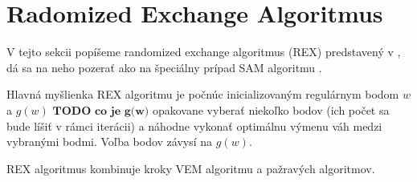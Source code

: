 \section {Radomized Exchange Algoritmus}

V tejto sekcii popíšeme randomized exchange algoritmus (REX) predstavený v \cite{rex_harman}, dá sa na neho pozerať ako na špeciálny prípad SAM algoritmu \cite{rex_harman}.

Hlavná myšlienka REX algoritmu je počnúc inicializovaným regulárnym bodom $w$ a $g(w)$ $\textbf{TODO co je g(w)}$ opakovane vyberať niekoľko bodov (ich počet sa bude líšiť v rámci iterácii) a náhodne vykonať optimálnu výmenu váh medzi vybranými bodmi. Voľba bodov závysí na $g(w)$.

REX algoritmus kombinuje kroky VEM algoritmu a pažravých algoritmov.

